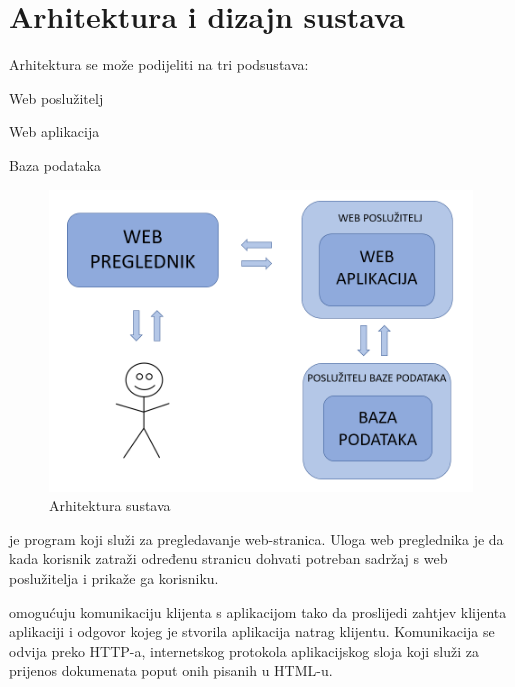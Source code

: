 \chapter{Arhitektura i dizajn sustava}
			
		\text Arhitektura se može podijeliti na tri podsustava:
		\begin{packed_item}
			
			\item Web poslužitelj
			\item Web aplikacija
			\item Baza podataka
			
		\end{packed_item}

		\begin{figure}[H]
			\includegraphics[scale=0.50]{slike/arhitektura.png} %
			\centering
			\caption{Arhitektura sustava}
			\label{fig:arhitekura slika}
		\end{figure}
	
		\textit {} \text je program koji služi za pregledavanje web-stranica. Uloga web preglednika je da kada korisnik zatraži određenu stranicu dohvati potreban sadržaj s web poslužitelja i prikaže ga korisniku. 
		
		\textit {} \text omogućuju komunikaciju klijenta s aplikacijom tako da proslijedi zahtjev klijenta aplikaciji i odgovor kojeg je stvorila aplikacija natrag klijentu. Komunikacija se odvija preko HTTP-a, internetskog protokola aplikacijskog sloja koji služi za prijenos dokumenata poput onih pisanih u HTML-u. 
		
